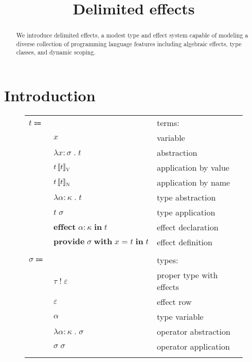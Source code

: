 \documentclass[12pt]{article}
\title{Delimited effects}
\date{}
\newcommand\anno[2]{#1 : #2} %
\newcommand\term{t}
\newcommand\evar{x}
\newcommand\eabs[2]{\lambda #1 \; . \; #2} %
\newcommand\eappbv[2]{#1 \left\llbracket #2 \right\rrbracket_{\textsc{V}}} %
\newcommand\eappbn[2]{#1 \left\llbracket #2 \right\rrbracket_{\textsc{N}}} %
\newcommand\etabs[2]{\lambda #1 \; . \; #2} %
\newcommand\etapp[2]{#1 \; #2}
\newcommand\eeffect[3]{\textbf{effect} \; \anno{#1}{#2} \; \textbf{in} \; #3}
\newcommand\eprovide[4]{\textbf{provide} \; #1 \; \textbf{with} \; #2 = #3 \; \textbf{in} \; #4}
\newcommand\type{\sigma}
\newcommand\tptwithr[2]{#1 \; ! \; #2} %
\newcommand\tvar{\alpha}
\newcommand\tabs[2]{\lambda #1 \; . \; #2} %
\newcommand\tapp[2]{#1 \; #2} %
\newcommand\properType{\tau}
\newcommand\row{\varepsilon}
\newcommand\kind{\kappa}
\begin{document}
  \maketitle

  \begin{abstract}
    We introduce delimited effects, a modest type and effect system capable of modeling a diverse collection of programming language features including algebraic effects, type classes, and dynamic scoping.
  \end{abstract}

  \section{Introduction}

  \begin{figure}
    \begin{mdframed}[backgroundcolor=none]
      \begin{center}
        \begin{tabular}{l l l}
          $\term \Coloneqq $ & & terms: \\
          & $\evar$ & variable \\
          & $\eabs{\anno{\evar}{\type}}{\term}$ & abstraction \\
          & $\eappbv{\term}{\term}$ & application by value \\
          & $\eappbn{\term}{\term}$ & application by name \\
          & $\etabs{\anno{\tvar}{\kind}}{\term}$ & type abstraction \\
          & $\etapp{\term}{\type}$ & type application \\
          & $\eeffect{\tvar}{\kind}{\term}$ & effect declaration \\
          & $\eprovide{\type}{\evar}{\term}{\term}$ & effect definition \\
          \\
          $\type \Coloneqq$ & & types: \\
          & $\tptwithr{\properType}{\row}$ & proper type with effects \\
          & $\row$ & effect row \\
          & $\tvar$ & type variable \\
          & $\tabs{\anno{\tvar}{\kind}}{\type}$ & operator abstraction \\
          & $\tapp{\type}{\type}$ & operator application \\
          \\

\end{tabular}
\end{center}
\end{mdframed}
\end{figure}
\end{document}
